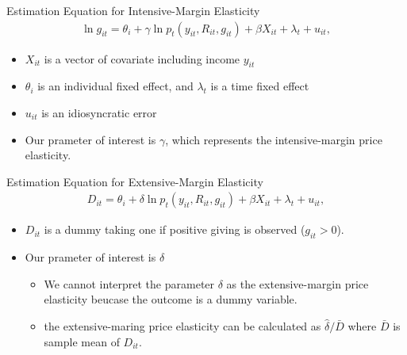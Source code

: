 \documentclass[
  ignorenonframetext,
  aspectratio=169,
]{beamer}
\providecommand{\tightlist}{%
  \setlength{\itemsep}{0pt}\setlength{\parskip}{0pt}}
\begin{document}
\begin{frame}{Estimation Equation for Intensive-Margin Elasticity}
\protect\hypertarget{estimation-equation-for-intensive-margin-elasticity}{}
\begin{align}
  \ln g_{it} = \theta_i + \gamma \ln p_t(y_{it}, R_{it}, g_{it})
  + \beta X_{it} + \lambda_t + u_{it}, \label{eq:intensive}
\end{align}

\begin{itemize}
\tightlist
\item
  \(X_{it}\) is a vector of covariate including income \(y_{it}\)
\item
  \(\theta_i\) is an individual fixed effect, and \(\lambda_t\) is a time fixed effect
\item
  \(u_{it}\) is an idiosyncratic error
\item
  Our prameter of interest is \(\gamma\), which represents the intensive-margin price elasticity.
\end{itemize}
\end{frame}

\begin{frame}{Estimation Equation for Extensive-Margin Elasticity}
\protect\hypertarget{estimation-equation-for-extensive-margin-elasticity}{}
\begin{align}
  D_{it} = \theta_i + \delta \ln p_t(y_{it}, R_{it}, g_{it})
  + \beta X_{it} + \lambda_t + u_{it}, \label{eq:extensive}
\end{align}

\begin{itemize}
\tightlist
\item
  \(D_{it}\) is a dummy taking one if positive giving is observed (\(g_{it} > 0\)).
\item
  Our prameter of interest is \(\delta\)

  \begin{itemize}
  \tightlist
  \item
    We cannot interpret the parameter \(\delta\) as the extensive-margin price elasticity beucase the outcome is a dummy variable.
  \item
    the extensive-maring price elasticity can be calculated as \(\hat{\delta} / \bar{D}\) where \(\bar{D}\) is sample mean of \(D_{it}\).
  \end{itemize}
\end{itemize}
\end{frame}
\end{document}
